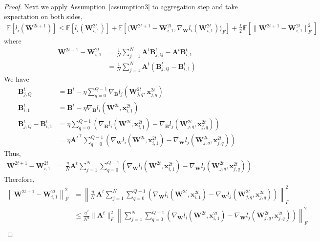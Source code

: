 \begin{proof}
Next we apply Assumption~\ref{assumption3} to aggregation step and take expectation on both sides,
\begin{align}
     \mathbb{E}[l_i(\mathbf{W}^{2t+1})] \leq \mathbb{E}[l_i(\mathbf{W}^{2t}_{i,1})] + \mathbb{E}[\langle \mathbf{W}^{2t+1} - \mathbf{W}^{2t}_{i,1}, \nabla_{\mathbf{W}} l_i(\mathbf{W}^{2t}_{i,1})\rangle_F ]+ \frac{L}{2} \mathbb{E}[ \| \mathbf{W}^{2t+1} - \mathbf{W}^{2t}_{i,1} \|_F^2] \label{eq:lipschitz-2}
\end{align}
where 
\begin{align}
     \mathbf{W}^{2t+1} - \mathbf{W}^{2t}_{i,1} &= \frac{1}{N}\sum_{j=1}^{N} \mathbf{A}^t \mathbf{B}^t_{j,Q}-\mathbf{A}^t \mathbf{B}^t_{i,1} \label{eq:aggre-fixA}\\
     & = \frac{1}{N}\sum_{j=1}^{N} \mathbf{A}^t ( \mathbf{B}^t_{j,Q}-\mathbf{B}^t_{i,1})  \label{smooth-2}
\end{align}
We have
\begin{align}
    \mathbf{B}^t_{j,Q} &= \mathbf{B}^t - \eta \sum_{q=0}^{Q-1} \nabla_{\mathbf{B}} l_j(\mathbf{W}^{2t}_{j,q},\mathbf{x}_{j,q}^{2t}) \\
    \mathbf{B}^t_{i,1} &= \mathbf{B}^t - \eta \nabla_{\mathbf{B}} l_i (\mathbf{W}^{2t},\mathbf{x}_{i,1}^{2t}) \\
    \mathbf{B}^t_{j,Q} - \mathbf{B}^t_{i,1} &= \eta \sum_{q=0}^{Q-1} (\nabla_{\mathbf{B}} l_i (\mathbf{W}^{2t},\mathbf{x}_{i,1}^{2t}) - \nabla_{\mathbf{B}} l_j(\mathbf{W}^{2t}_{j,q},\mathbf{x}_{j,q}^{2t})) \\
    & = \eta {\mathbf{A}^t}^\top \sum_{q=0}^{Q-1}(\nabla_{\mathbf{W}} l_i (\mathbf{W}^{2t},\mathbf{x}_{i,1}^{2t}) - \nabla_{\mathbf{W}} l_j(\mathbf{W}^{2t}_{j,q},\mathbf{x}_{j,q}^{2t}))
\end{align}
Thus,
\begin{align}
     \mathbf{W}^{2t+1} - \mathbf{W}^{2t}_{i,1} &= \frac{\eta}{N} \mathbf{A}^t \sum_{j=1}^{N} \sum_{q=0}^{Q-1} (\nabla_{\mathbf{W}} l_i (\mathbf{W}^{2t},\mathbf{x}_{i,1}^{2t}) - \nabla_{\mathbf{W}} l_j(\mathbf{W}^{2t}_{j,q},\mathbf{x}_{j,q}^{2t}))
\end{align}
Therefore, 
\begin{align}
 \left\|\mathbf{W}^{2t+1} - \mathbf{W}^{2t}_{i,1} \right\|_F^2 
&=  \left\|\frac{\eta}{N}\, \mathbf{A}^t \sum_{j=1}^{N} \sum_{q=0}^{Q-1} \left( \nabla_{\mathbf{W}} l_i (\mathbf{W}^{2t},\mathbf{x}_{i,1}^{2t}) - \nabla_{\mathbf{W}} l_j(\mathbf{W}^{2t}_{j,q},\mathbf{x}_{j,q}^{2t}) \right) \right\|_F^2  \\
&\le \frac{\eta^2}{N^2} \|\mathbf{A}^t\|_F^2 \left\| \sum_{j=1}^{N} \sum_{q=0}^{Q-1} \left( \nabla_{\mathbf{W}} l_i (\mathbf{W}^{2t},\mathbf{x}_{i,1}^{2t}) - \nabla_{\mathbf{W}} l_j(\mathbf{W}^{2t}_{j,q},\mathbf{x}_{j,q}^{2t}) \right) \right\|_F^2 \\

\end{align}
\end{proof}
